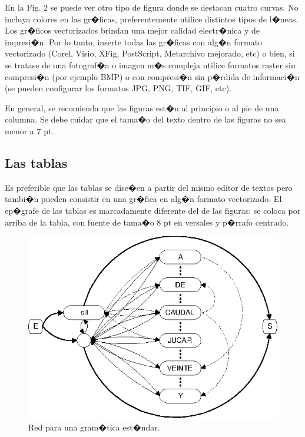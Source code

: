\documentclass[conference,a4paper,10pt,oneside,final]{tfmpd}
\begin{document}
En la Fig. 2 se puede ver otro tipo de figura donde se destacan cuatro curvas. No incluya colores en las gr�ficas, preferentemente utilice distintos tipos de l�neas. Los gr�ficos vectorizados brindan una mejor calidad electr�nica y de impresi�n. Por lo tanto, inserte todas las gr�ficas con alg�n formato vectorizado (Corel, Visio, XFig, PostScript, Metarchivo mejorado, etc) o bien, si se tratase de una fotograf�a o imagen m�s compleja utilice formatos raster sin 
compresi�n (por ejemplo BMP) o con compresi�n sin p�rdida de informaci�n (se pueden configurar los formatos JPG, PNG, TIF, GIF, etc).

En general, se recomienda que las figuras est�n al principio o al pie de una columna. Se debe cuidar que el tama�o del texto dentro de las figuras no sea menor a 7 pt.

\subsection{Las tablas}

Es preferible que las tablas se dise�en a partir del mismo editor de textos pero tambi�n pueden consistir en una gr�fica en alg�n formato vectorizado. El ep�grafe de las tablas es marcadamente diferente del de las figuras: se coloca por arriba de la tabla, con fuente de tama�o 8 pt en versales y p�rrafo centrado.

\begin{figure}[tbhp]
\centerline{\includegraphics{sgram}}
\caption{Red para una gram�tica est�ndar. }
\label{fig1}
\end{figure}
\end{document}
